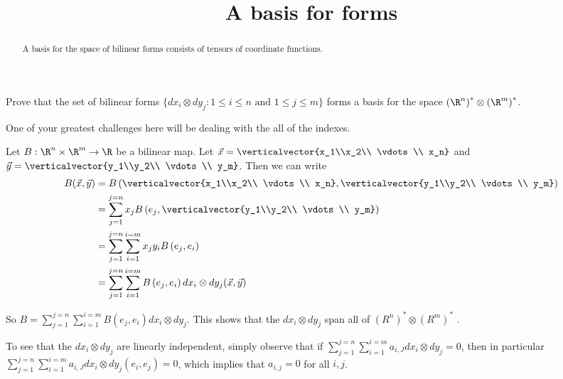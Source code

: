 \documentclass{ximera}
\title{A basis for forms}
\begin{document}
\begin{abstract}
  A basis for the space of bilinear forms consists of tensors of coordinate functions.
\end{abstract}\maketitle	

Prove that the set of bilinear forms $\{ dx_i \otimes dy_j : 1 \leq i \leq n \text{ and } 1\leq j \leq m\}$ forms a basis for the space 
$\left(\R^n\right)^* \otimes \left(\R^m\right)^*$.

\begin{warning}
  One of your greatest challenges here will be dealing with the all of the indexes.
\end{warning}
	
\begin{free-response}
  Let $B:\R^n \times \R^m \to \R$ be a bilinear map.  Let $\vec{x} = \verticalvector{x_1\\x_2\\ \vdots \\ x_n}$ and 
  $\vec{y} = \verticalvector{y_1\\y_2\\ \vdots \\ y_m}$. Then we can write
  \begin{align*}
    B(\vec{x},\vec{y})&=
    B\left( \verticalvector{x_1\\x_2\\ \vdots \\ x_n}, \verticalvector{y_1\\y_2\\ \vdots \\ y_m}\right) \\
    &= \sum_{j=1}^{j=n} x_jB\left( e_j, \verticalvector{y_1\\y_2\\ \vdots \\ y_m}\right)\\
    &= \sum_{j=1}^{j=n} \sum_{i=1}^{i=m} x_jy_i B\left( e_j , e_i\right)\\
    &= \sum_{j=1}^{j=n} \sum_{i=1}^{i=m} B\left( e_j,e_i\right) dx_i \otimes dy_j(\vec{x},\vec{y})
  \end{align*}
  
  So $B = \sum_{j=1}^{j=n} \sum_{i=1}^{i=m} B\left( e_j,e_i\right) dx_i \otimes dy_j$.  This shows that the $dx_i \otimes dy_j$ span all of 
  $\left(R^n\right)^* \otimes \left(R^m\right)^*$ .
  
  To see that the $dx_i \otimes dy_j$ are linearly independent, simply observe that if 
  $\sum_{j=1}^{j=n} \sum_{i=1}^{i=m} a_{i,J} dx_i \otimes dy_j = 0$, then in particular
  $\sum_{j=1}^{j=n} \sum_{i=1}^{i=m} a_{i,J} dx_i \otimes dy_j (e_i,e_j)= 0$, which implies that
  $a_{i,j} = 0$ for all $i,j$.
\end{free-response}
\end{document}
